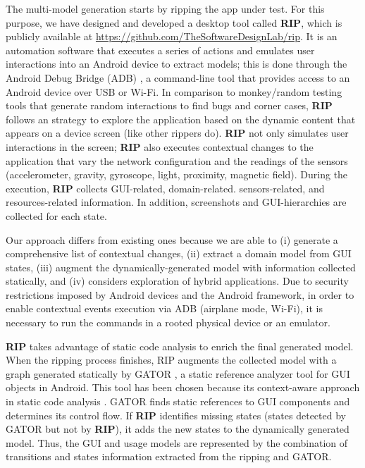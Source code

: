 The multi-model generation starts by ripping the app under test. For this purpose, we have designed and developed a desktop tool called \textbf{RIP}, which is publicly available at \url{https://github.com/TheSoftwareDesignLab/rip}. It is an automation software that executes a series of actions and emulates user interactions into an Android device to extract models; this is done through the Android Debug Bridge (ADB) \cite{adb}, a command-line tool that provides access to an Android device over USB or Wi-Fi. In comparison to monkey/random testing tools that generate random interactions to find bugs and corner cases, \textbf{RIP} follows an strategy to explore the application based on the dynamic content that appears on a device screen (like other rippers do). \textbf{RIP} not only simulates user interactions in the screen; \textbf{RIP} also executes contextual changes to the application that vary the network configuration and the readings of the sensors (\eg accelerometer, gravity, gyroscope, light, proximity, magnetic field).  During the execution,  \textbf{RIP} collects GUI-related, domain-related. sensors-related, and resources-related information. In addition, screenshots and  GUI-hierarchies are collected for each state.

Our approach differs from existing ones because we are able to (i) generate a comprehensive list of contextual changes, (ii) extract a domain model from GUI states,  (iii) augment the dynamically-generated model with information collected statically, and (iv) considers exploration of hybrid applications. Due to security restrictions imposed by Android devices and the Android framework, in order to enable contextual events execution via ADB (\eg airplane mode, Wi-Fi), it is necessary to run the commands in a rooted physical device or an emulator.

\textbf{RIP} takes advantage of static code analysis to enrich the final generated model. When the ripping process finishes, RIP augments the collected model with a graph generated statically by GATOR \cite{gator}, a static reference analyzer tool for GUI objects in Android. This tool has been chosen because its context-aware approach in static code analysis \cite{yang_yan_wu_wang_rountev_2015}. GATOR finds static references to GUI components and determines its control flow. If \textbf{RIP} identifies missing states (\ie states detected by GATOR but not by \textbf{RIP}), it adds the new states to the dynamically generated model. Thus, the  GUI and usage models are represented by the combination of transitions and states information extracted from the ripping and GATOR.


